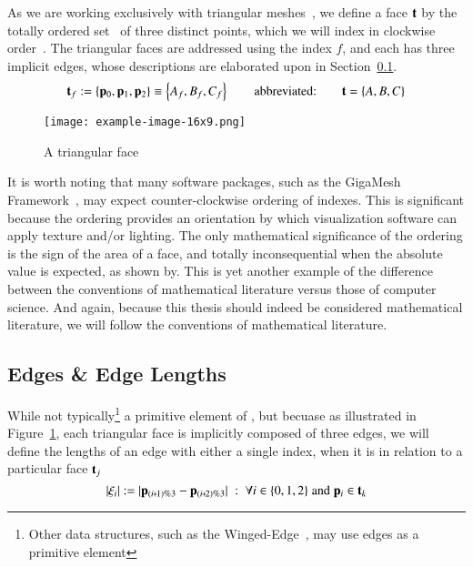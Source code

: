 As we are working exclusively with triangular meshes~\cite[p.~26]{Mara12}, we define a face $\mathbf{t}$ by the totally ordered set~\cite{Weisstein19a} of three distinct points, which we will index in clockwise order~\cite[p.~4]{Mara17}. The triangular faces are addressed using the index $f$, and each has three implicit edges, whose descriptions are elaborated upon in Section~\ref{chBsEEL}.
\begin{equation}
	\mathbf{t}_f := \left \{\mathbf{p}_0, \mathbf{p}_1, \mathbf{p}_2\right \} \equiv \left \{A_f, B_f, C_f\right \} \hspace{20pt}\text{abbreviated:}\hspace{20pt} \mathbf{t} = \left \{A, B, C\right \}
	\label{eq:defineSetOfFaces}
\end{equation}%
%
%



\begin{figure}[ht]
\ffigbox
	{\texttt{[image: example-image-16x9.png]}}
	{\caption[A Triangular Face]{A triangular face}\label{fig:facesOfAMesh}}
\end{figure}%

It is worth noting that many software packages, such as the GigaMesh Framework~\cite[p.~89]{Mara12}, may expect counter-clockwise ordering of indexes. This is significant because the ordering provides an orientation by which visualization software can apply texture and/or lighting. The only mathematical significance of the ordering is the sign of the area of a face, and totally inconsequential when the absolute value is expected, as shown by\cite[p.~2]{Braden86}. This is yet another example of the difference between the conventions of mathematical literature versus those of computer science. And again, because this thesis should indeed be considered mathematical literature, we will follow the conventions of mathematical literature. 
%
\subsection{Edges \& Edge Lengths}
\label{chBsEEL}
While not typically\footnote{Other data structures, such as the Winged-Edge~\cite[p.~1]{Baumgart75}, may use edges as a primitive element} a primitive element of \tdd{}, but becuase as illustrated in Figure~\ref{fig:facesOfAMesh}, each triangular face is implicitly composed of three edges, we will define the lengths of an edge with either a single index, when it is in relation to a particular face $\mathbf{t}_j$
\begin{equation}
	|\xi_i| := |\bp_{(\sipo)\%3} - \bp_{(\sipt)\%3}| \;:\; \forall i \in\{0,1,2\} \;\text{and}\; \bp_i \in \bt_k
	\label{eq:defineEdgeLengthFace}
\end{equation}%

